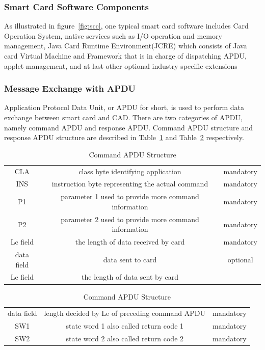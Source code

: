 \documentclass[]{llncs}
\begin{document}
\subsubsection{Smart Card Software Components}
As illustrated in figure~\ref{fig:scc}, one typical smart card software includes Card Operation System, native services such as I/O operation and memory management, Java Card Runtime Environment(JCRE) which consists of Java card  Virtual Machine and Framework that is in charge of dispatching APDU, applet management, and at last other optional industry specific extensions\cite{jcadg}



\subsubsection{Message Exchange with APDU}
Application Protocol Data Unit, or APDU for short, is used  to perform data exchange between smart card and CAD. There are two categories of APDU, namely command APDU and response APDU. Command APDU structure and response APDU structure are described in Table~\ref{table:capdu} and Table~\ref{table:rapdu} respectively\cite{handbuch}. 

\begin{table}[ht]
\caption{Command APDU Structure}
\centering
\begin{tabular}{ c c c}
\hline\hline
 CLA &class byte identifying application  & mandatory \\[0.5ex]
 INS &instruction byte representing the actual command  & mandatory \\
 P1 &parameter 1 used to provide more command information & mandatory \\
 P2 &parameter 2 used to provide more command information& mandatory \\
 Lc field &the length of data received by card & mandatory \\
 data field &data sent to card& optional \\
Le field &the length of data sent by card \\
\hline
\end{tabular}
\label{table:capdu}
\end{table}

\begin{table}[ht]
\caption{Command APDU Structure}
\centering
\begin{tabular}{ c c c}
\hline\hline
 data field & length decided by Le of preceding command  APDU  & mandatory \\[0.5ex]
 SW1 &state word 1 also called return code 1  & mandatory \\
 SW2 &state word 2 also called return code 2& mandatory \\
\hline
\end{tabular}
\label{table:rapdu}
\end{table}
\end{document}
